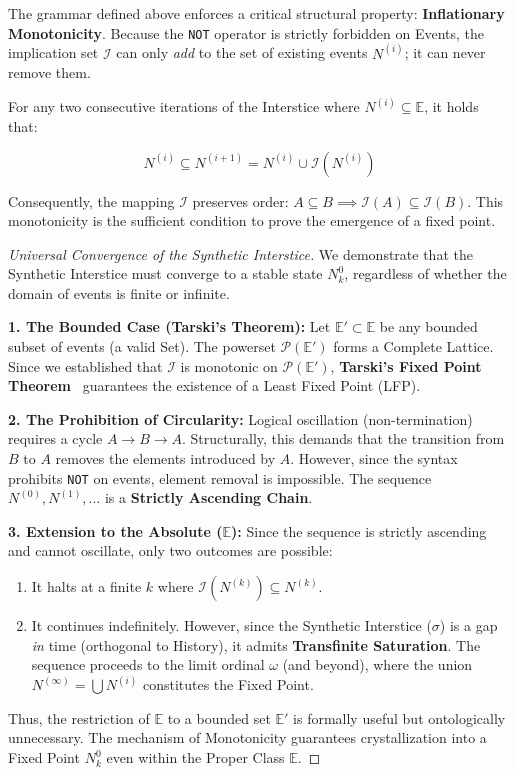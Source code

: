 \documentclass[11pt, a4paper]{article}
\theoremstyle{formalism}
\begin{document}
The grammar defined above enforces a critical structural property: \textbf{Inflationary Monotonicity}. Because the \texttt{NOT} operator is strictly forbidden on Events, the implication set $\mathcal{I}$ can only \textit{add} to the set of existing events $N^{(i)}$; it can never remove them.

For any two consecutive iterations of the Interstice where $N^{(i)} \subseteq \mathbb{E}$, it holds that:

\begin{equation}
    N^{(i)} \subseteq N^{(i+1)} = N^{(i)} \cup \mathcal{I}(N^{(i)})
\end{equation}

Consequently, the mapping $\mathcal{I}$ preserves order: $A \subseteq B \implies \mathcal{I}(A) \subseteq \mathcal{I}(B)$. This monotonicity is the sufficient condition to prove the emergence of a fixed point.

\begin{proof}[Universal Convergence of the Synthetic Interstice]

    We demonstrate that the Synthetic Interstice must converge to a stable state $N^0_k$, regardless of whether the domain of events is finite or infinite.

    \textbf{1. The Bounded Case (Tarski's Theorem):}
    Let $\mathbb{E}' \subset \mathbb{E}$ be any bounded subset of events (a valid Set). The powerset $\mathcal{P}(\mathbb{E}')$ forms a Complete Lattice. Since we established that $\mathcal{I}$ is monotonic on $\mathcal{P}(\mathbb{E}')$, \textbf{Tarski's Fixed Point Theorem}~\cite{Tarski1955} guarantees the existence of a Least Fixed Point (LFP).
    
    \textbf{2. The Prohibition of Circularity:}
    Logical oscillation (non-termination) requires a cycle $A \to B \to A$. Structurally, this demands that the transition from $B$ to $A$ removes the elements introduced by $A$. However, since the syntax prohibits \texttt{NOT} on events, element removal is impossible. The sequence $N^{(0)}, N^{(1)}, \dots$ is a \textbf{Strictly Ascending Chain}.
    
    \textbf{3. Extension to the Absolute ($\mathbb{E}$):}
    Since the sequence is strictly ascending and cannot oscillate, only two outcomes are possible:
    \begin{enumerate}
        \item It halts at a finite $k$ where $\mathcal{I}(N^{(k)}) \subseteq N^{(k)}$.
        \item It continues indefinitely. However, since the Synthetic Interstice ($\sigma$) is a gap \textit{in} time (orthogonal to History), it admits \textbf{Transfinite Saturation}. The sequence proceeds to the limit ordinal $\omega$ (and beyond), where the union $N^{(\infty)} = \bigcup N^{(i)}$ constitutes the Fixed Point.
    \end{enumerate}

    Thus, the restriction of $\mathbb{E}$ to a bounded set $\mathbb{E}'$ is formally useful but ontologically unnecessary. The mechanism of Monotonicity guarantees crystallization into a Fixed Point $N^0_k$ even within the Proper Class $\mathbb{E}$.
\end{proof}
\end{document}
